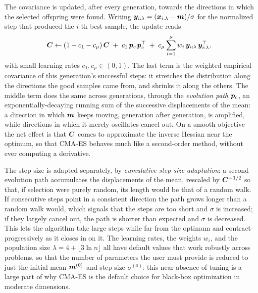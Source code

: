 \begin{figure}[htbp]
\label{fig:cma-es}
\end{figure}

The covariance is updated, after every generation, towards the directions in which the selected offspring were found. Writing $\bm{y}_{i:\lambda} = (\bm{x}_{i:\lambda} - \bm{m})/\sigma$ for the normalized step that produced the $i$-th best sample, the update reads
\begin{equation}
\bm{C} \leftarrow (1 - c_1 - c_\mu)\, \bm{C} \;+\; c_1\, \bm{p}_c\, \bm{p}_c^{\top} \;+\; c_\mu \sum_{i=1}^{\mu} w_i\, \bm{y}_{i:\lambda}\, \bm{y}_{i:\lambda}^{\top},
\label{eq:cma-cov}
\end{equation}
with small learning rates $c_1, c_\mu \in (0,1)$. The last term is the weighted empirical covariance of this generation's successful steps: it stretches the distribution along the directions the good samples came from, and shrinks it along the others. The middle term does the same across generations, through the \emph{evolution path} $\bm{p}_c$, an exponentially-decaying running sum of the successive displacements of the mean: a direction in which $\bm{m}$ keeps moving, generation after generation, is amplified, while directions in which it merely oscillates cancel out. On a smooth objective the net effect is that $\bm{C}$ comes to approximate the inverse Hessian near the optimum, so that CMA-ES behaves much like a second-order method, without ever computing a derivative.

The step size is adapted separately, by \emph{cumulative step-size adaptation}: a second evolution path accumulates the displacements of the mean, rescaled by $\bm{C}^{-1/2}$ so that, if selection were purely random, its length would be that of a random walk. If consecutive steps point in a consistent direction the path grows longer than a random walk would, which signals that the steps are too short and $\sigma$ is increased; if they largely cancel out, the path is shorter than expected and $\sigma$ is decreased. This lets the algorithm take large steps while far from the optimum and contract progressively as it closes in on it. The learning rates, the weights $w_i$, and the population size $\lambda = 4 + \lfloor 3\ln n \rfloor$ all have default values that work robustly across problems, so that the number of parameters the user must provide is reduced to just the initial mean $\bm{m}^{(0)}$ and step size $\sigma^{(0)}$: this near absence of tuning is a large part of why CMA-ES is the default choice for black-box optimization in moderate dimensions.


